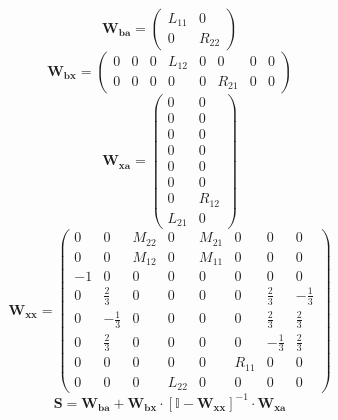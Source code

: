 \[ \mathbf{W_{ba}} = \left(\begin{smallmatrix} L_{11} & 0 \\ 0 & R_{22} \end{smallmatrix}\right) \]
\[ \mathbf{W_{bx}} = \left(\begin{smallmatrix} 0 & 0 & 0 & L_{12} & 0 & 0 & 0 & 0 \\ 0 & 0 & 0 & 0 & 0 & R_{21} & 0 & 0 \end{smallmatrix}\right) \]
\[ \mathbf{W_{xa}} = \left(\begin{smallmatrix} 0 & 0 \\ 0 & 0 \\ 0 & 0 \\ 0 & 0 \\ 0 & 0 \\ 0 & 0 \\ 0 & R_{12} \\ L_{21} & 0 \end{smallmatrix}\right) \]
\[ \mathbf{W_{xx}} = \left(\begin{smallmatrix} 0 & 0 & M_{22} & 0 & M_{21} & 0 & 0 & 0 \\ 0 & 0 & M_{12} & 0 & M_{11} & 0 & 0 & 0 \\ -1 & 0 & 0 & 0 & 0 & 0 & 0 & 0 \\ 0 & \frac{2}{3} & 0 & 0 & 0 & 0 & \frac{2}{3} & -\frac{1}{3} \\ 0 & -\frac{1}{3} & 0 & 0 & 0 & 0 & \frac{2}{3} & \frac{2}{3} \\ 0 & \frac{2}{3} & 0 & 0 & 0 & 0 & -\frac{1}{3} & \frac{2}{3} \\ 0 & 0 & 0 & 0 & 0 & R_{11} & 0 & 0 \\ 0 & 0 & 0 & L_{22} & 0 & 0 & 0 & 0 \end{smallmatrix}\right) \]
\[ \mathbf{S}=\mathbf{W_{ba}}+\mathbf{W_{bx}}\cdot\left[ \mathbb{I}  -\mathbf{W_{xx}}\right]^{-1}\cdot\mathbf{W_{xa}} \]
